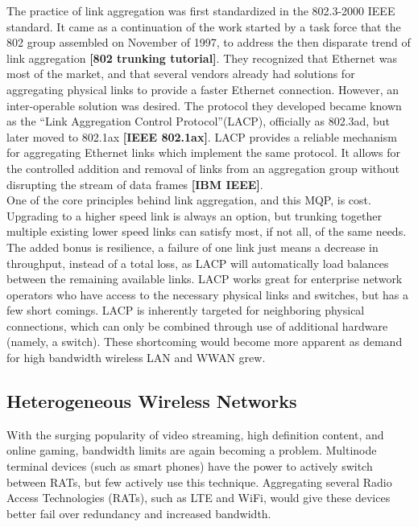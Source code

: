 \documentclass[12pt]{article}
\newcommand{\lcite}[1]
{{\bfseries\color{orange}[#1]}}
\begin{document}
	The practice of link aggregation was first standardized in the 802.3-2000 IEEE standard. It came as a continuation of the work started by a task force that the 802 group assembled on November of 1997, to address the then disparate trend of link aggregation \lcite{802 trunking tutorial}. They recognized that Ethernet was most of the market, and that several vendors already had solutions for aggregating physical links to provide a faster Ethernet connection. However, an inter-operable solution was desired. The protocol they developed became known as the ``Link Aggregation Control Protocol''(LACP), officially as 802.3ad, but later moved to 802.1ax \lcite{IEEE 802.1ax}. LACP provides a reliable mechanism for aggregating Ethernet links which implement the same protocol. It allows for the controlled addition and removal of links from an aggregation group without disrupting the stream of data frames \lcite{IBM IEEE}.\\

	One of the core principles behind link aggregation, and this MQP, is cost. Upgrading to a higher speed link is always an option, but trunking together multiple existing lower speed links can satisfy most, if not all, of the same needs. The added bonus is resilience, a failure of one link just means a decrease in throughput, instead of a total loss, as LACP will automatically load balances between the remaining available links. LACP works great for enterprise network operators who have access to the necessary physical links and switches, but has a few short comings. LACP is inherently targeted for neighboring physical connections, which can only be combined through use of additional hardware (namely, a switch). These shortcoming would become more apparent as demand for high bandwidth wireless LAN and WWAN grew.\\

\subsection{Heterogeneous Wireless Networks}

	With the surging popularity of video streaming, high definition content, and online gaming, bandwidth limits are again becoming a problem. Multinode terminal devices (such as smart phones) have the power to actively switch between RATs, but few actively use this technique. Aggregating several Radio Access Technologies (RATs), such as LTE and WiFi, would give these devices better fail over redundancy and increased bandwidth. \\
\end{document}

